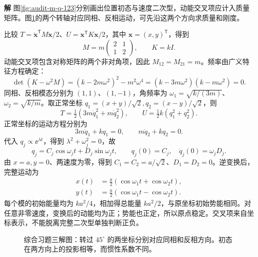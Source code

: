 \documentclass[11pt,openany,fontset=fandol]{ctexbook}
\theoremstyle{plain}\newtheorem{theorem}{定理}[chapter]\newtheorem{proposition}[theorem]{命题}
\theoremstyle{definition}\newtheorem{definition}{定义}[chapter]\newtheorem{example}{例}[chapter]
\theoremstyle{remark}\newtheorem*{remark}{说明}
\newcommand{\SolutionStart}{\par\nobreak\medskip\nobreak\noindent\textbf{解}\quad\ignorespaces}
\newenvironment{solution}{\SolutionStart}{\par\medskip}
\newcommand{\vct}[1]{\bm{#1}}\newcommand{\Rea}{\operatorname{Re}}\newcommand{\Ima}{\operatorname{Im}}
\begin{document}
\begin{solution}
图\ref{fig:audit-m-q-123}分别画出位置初态与速度二次型，动能交叉项应计入质量矩阵。图\ref{fig:mixed-3}的两个转轴对应同相、反相运动，可先沿这两个方向求质量和刚度。

比较 $T=\dot{\vct x}^{\mathsf T}M\dot{\vct x}/2$、$U=\vct x^{\mathsf T}K\vct x/2$，其中 $\vct x=(x,y)^{\mathsf T}$，得到
\[
M=m\begin{pmatrix}2&1\\1&2\end{pmatrix},\qquad K=kI.
\]
动能交叉项包含对称矩阵的两个非对角项，因此 $M_{12}=M_{21}=m$。频率由广义特征方程确定：
\[
\det(K-\omega^2M)=(k-2m\omega^2)^2-m^2\omega^4
=(k-3m\omega^2)(k-m\omega^2)=0.
\]
同相、反相模态分别为 $(1,1)$、$(1,-1)$，角频率为 $\omega_1=\sqrt{k/(3m)}$、$\omega_2=\sqrt{k/m}$。取正常坐标 $q_1=(x+y)/\sqrt2,q_2=(x-y)/\sqrt2$，则
\[
T=\tfrac12(3m\dot q_1^2+m\dot q_2^2),\qquad
U=\tfrac12k(q_1^2+q_2^2).
\]
正常坐标的运动方程分别为
\[
3m\ddot q_1+kq_1=0,\qquad m\ddot q_2+kq_2=0.
\]
代入 $q_j\propto\ee^{\lambda t}$，得到 $\lambda^2+\omega_j^2=0$，故
\[
q_j=C_j\cos\omega_jt+D_j\sin\omega_jt,
\qquad q_j(0)=C_j,\quad \dot q_j(0)=\omega_jD_j.
\]
由 $x=a,y=0$、两速度为零，得到 $C_1=C_2=a/\sqrt2$、$D_1=D_2=0$。逆变换后，完整运动为
\begin{align*}
x(t)&=\tfrac a2(\cos\omega_1t+\cos\omega_2t),\\
y(t)&=\tfrac a2(\cos\omega_1t-\cos\omega_2t).
\end{align*}
每个模的初始能量均为 $ka^2/4$，相加得总能量 $ka^2/2$，与原坐标初始势能相同。对任意非零速度，变换后的动能均为正；势能也正定，所以原点稳定。交叉项来自坐标表示，不能脱离完整二次型单独判断正负。

\begin{figure}[H]\centering
{}
\caption{综合习题三解图：转过 $45^\circ$ 的两坐标分别对应同相和反相方向。初态在两方向上的投影相等，而惯性系数不同。}\label{fig:mixed-3}
\end{figure}

\end{solution}
\end{document}
